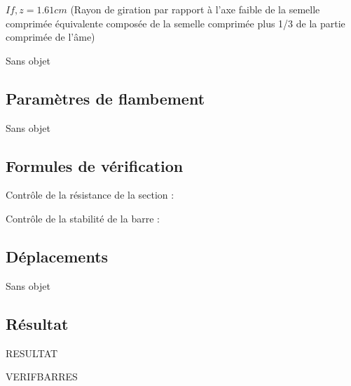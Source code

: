 \documentclass[10pt,a4paper,titlepage]{report}
\begin{document}
$I{f,z} = 1.61 cm$ (Rayon de giration par rapport à l'axe faible de la semelle comprimée équivalente composée de la semelle comprimée plus 1/3 de la partie comprimée de l'âme)

Sans objet

\subsection{Paramètres de flambement}

Sans objet

\subsection{Formules de vérification}

Contrôle de la résistance de la section :

Contrôle de la stabilité de la barre :

\subsection{Déplacements}

Sans objet

\subsection{Résultat}

RESULTAT

VERIFBARRES
\end{document}
